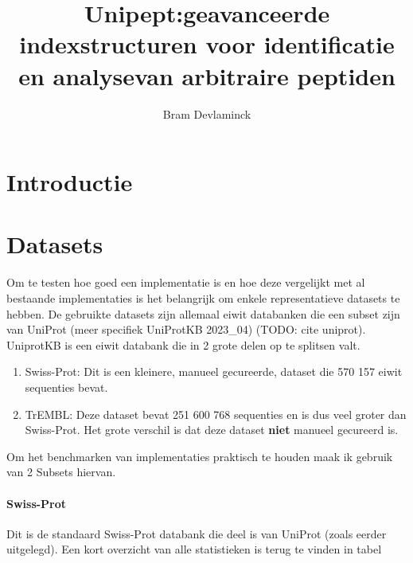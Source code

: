 \documentclass[11pt,dutch,faculty=we,layout=titlefont,underline=false,titleUppercase=true,titleUnderline=true]{ugent2016-report}
\author{Bram Devlaminck}
\title{Unipept:\newline geavanceerde indexstructuren \newline voor identificatie en analyse\newline van arbitraire peptiden}
\begin{document}
    \maketitle


    \setmonofont[Scale=MatchLowercase,Contextuals={Alternate}]{Jetbrains Mono}



    {\hypersetup{hidelinks}\tableofcontents} %
    \newpage




    \section{Introductie}\label{sec:introductie}


    \section{Datasets}\label{sec:datasets}
    Om te testen hoe goed een implementatie is en hoe deze vergelijkt met al bestaande implementaties is het belangrijk om enkele representatieve datasets te hebben.
    De gebruikte datasets zijn allemaal eiwit databanken die een subset zijn van UniProt (meer specifiek UniProtKB 2023\_04) (TODO: cite uniprot).
    UniprotKB is een eiwit databank die in 2 grote delen op te splitsen valt.
    \begin{enumerate}
        \item Swiss-Prot: Dit is een kleinere, manueel gecureerde, dataset die 570 157 eiwit sequenties bevat.
        \item TrEMBL: Deze dataset bevat 251 600 768 sequenties en is dus veel groter dan Swiss-Prot.
        Het grote verschil is dat deze dataset \textbf{niet} manueel gecureerd is.
    \end{enumerate}

    Om het benchmarken van implementaties praktisch te houden maak ik gebruik van 2 Subsets hiervan.
    \paragraph{Swiss-Prot} Dit is de standaard Swiss-Prot databank die deel is van UniProt (zoals eerder uitgelegd).
    Een kort overzicht van alle statistieken is terug te vinden in tabel
\end{document}
